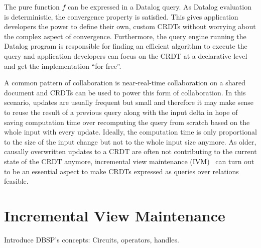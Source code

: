 The pure function \( f \) can be expressed in a Datalog query.
As Datalog evaluation is deterministic, the convergence property is satisfied.
This gives application developers the power to define their own, custom CRDTs
without worrying about the complex aspect of convergence.
Furthermore, the query engine running the Datalog program is responsible
for finding an efficient algorithm to execute the query and application developers
can focus on the CRDT at a declarative level and get the implementation ``for free''.

A common pattern of collaboration is near-real-time collaboration on a shared
document and CRDTs can be used to power this form of collaboration.
In this scenario, updates are usually frequent but small and therefore it
may make sense to reuse the result of a previous query along with the input
delta in hope of saving computation time over recomputing the query from scratch
based on the whole input with every update.
Ideally, the computation time is only proportional to the size of the input
change but not to the whole input size anymore.
As older, causally overwritten updates to a CRDT are often not contributing
to the current state of the CRDT anymore, incremental view
maintenance (IVM)~\cite{mcsherry2013differential, budiu2022dbsp, budiu2024dbsp}
can turn out to be an essential aspect to make CRDTs expressed as
queries over relations feasible.

\section{Incremental View Maintenance}

Introduce DBSP's concepts: Circuits, operators, handles.
